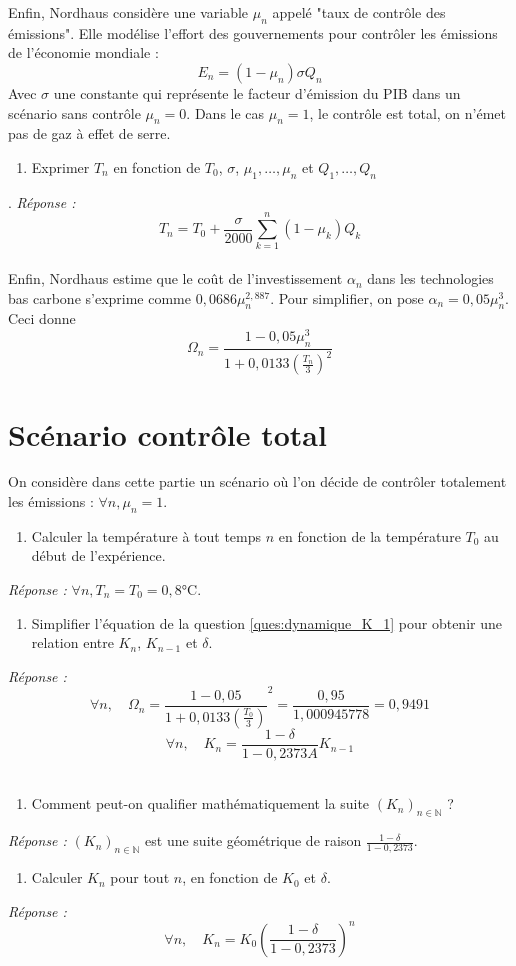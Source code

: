 \documentclass[12pt,a4paper]{article}
\newcommand{\ques}[1]{\begin{enumerate}[resume]
\item  #1
\end{enumerate}}
\newcommand{\rep}[1]{\textit{Réponse :} #1 \\}
\theoremstyle{remark}
\def\NN{\mathbb{N}}
\begin{document}
{Enfin, Nordhaus considère une variable $\mu_n$ appelé "taux de contrôle des émissions".
Elle modélise l'effort des gouvernements pour contrôler les émissions de l'économie mondiale :
\begin{equation*}
E_n=(1-\mu_n)\sigma Q_n
\end{equation*}
Avec $\sigma$ une constante qui représente le facteur d'émission du PIB dans un scénario sans contrôle $\mu_n=0$. 
Dans le cas $\mu_n=1$, le contrôle est total, on n'émet pas de gaz à effet de serre.
\ques{Exprimer $T_n$ en fonction de $T_0$, $\sigma$, $\mu_1, \dots, \mu_n$ et $Q_1, \dots ,Q_n$}.
\rep{\begin{equation*}T_n= T_0+\frac{\sigma}{2000} \sum_{k=1}^n (1-\mu_k) Q_k  \end{equation*}}

Enfin, Nordhaus estime que le coût de l'investissement $\alpha_n$ dans les technologies bas carbone s'exprime comme $0,0686 \mu_n^{2,887}$. Pour simplifier, on pose $\alpha_n = 0,05\mu_n^3$. Ceci donne 
\begin{equation*}
\Omega_n = \frac{1-0,05\mu_n^3}{1+0,0133 (\frac{T_n}{3})^2}
\end{equation*}

\section*{\sc Scénario contrôle total}
On considère dans cette partie un scénario où l'on décide de contrôler totalement les émissions : $\forall n, \mu_n=1$.
\ques{Calculer la température à tout temps $n$ en fonction de la température $T_0$ au début de l'expérience. }
\rep{$\forall n, T_n =T_0 = 0,8$°C.}

\ques{Simplifier l'équation de la question \ref{ques:dynamique_K_1} pour obtenir une relation entre $K_n$, $K_{n-1}$ et $\delta$.\label{ques:dynamique_K_2} }
\rep{
\begin{equation*}
\forall n, \quad \Omega_n = \frac{1-0,05}{1+0,0133 (\frac{T_0}{3})}^2=\frac{0,95}{1,000945778}=0,9491
\end{equation*}
\begin{equation*}
\forall n, \quad  K_n = \frac{1- \delta}{1- 0,2373 A} K_{n-1}
\end{equation*}
}

\ques{Comment peut-on qualifier mathématiquement la suite $(K_n)_{n\in \NN}$ ? \label{ques:suite_geo}}
\rep{$(K_n)_{n\in \NN}$ est une suite géométrique de raison $\frac{1- \delta}{1- 0,2373}$.}

\ques{Calculer $K_n$ pour tout $n$, en fonction de $K_0$ et $\delta$.}
\rep{\begin{equation*}
\forall n, \quad  K_n = K_0 \left(\frac{1- \delta}{1- 0,2373}\right)^n 
\end{equation*}}

}
\end{document}
